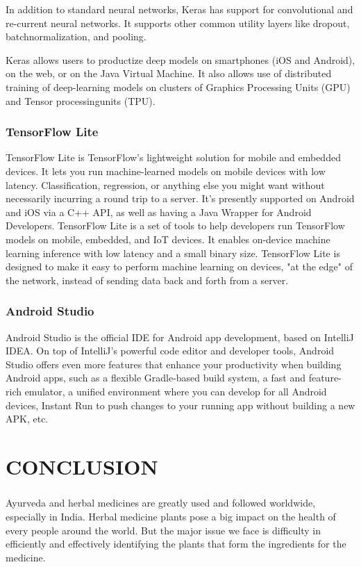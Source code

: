 In addition to standard neural networks, Keras has support for convolutional and re-current  neural  networks.   It  supports  other  common  utility  layers  like  dropout,  batchnormalization, and pooling.

Keras allows users to productize deep models on smartphones (iOS and Android), on the web, or on the Java Virtual Machine. It also allows use of distributed training of deep-learning models on clusters of Graphics Processing Units (GPU) and Tensor processingunits (TPU).

\subsection{TensorFlow Lite}
TensorFlow Lite is TensorFlow’s lightweight solution for mobile and embedded devices. It lets you run machine-learned models on mobile devices with low latency. Classification, regression, or anything else you might want without necessarily incurring a round trip to a server. It’s presently supported on Android and iOS via a C++ API, as well as having a Java Wrapper for Android Developers. TensorFlow Lite is a set of tools to help developers run TensorFlow models on mobile, embedded, and IoT devices. It enables on-device machine learning inference with low latency and a small binary size. TensorFlow Lite is designed to make it easy to perform machine learning on devices, "at the edge" of the network, instead of sending data back and forth from a server.

\subsection{Android Studio}
Android Studio is the official IDE for Android app development, based on IntelliJ IDEA. On top of IntelliJ’s powerful code editor and developer tools, Android Studio offers even more features that enhance your productivity when building Android apps, such as a flexible Gradle-based build system, a fast and feature-rich emulator, a unified environment where you can develop for all Android devices, Instant Run to push changes to your running app without building a new APK, etc.


\chapter{CONCLUSION}
\paragraph{}
Ayurveda and herbal medicines are greatly used and followed worldwide, especially in India. Herbal medicine plants pose a big impact on the health of every people around the world. But the major issue we face is difficulty in efficiently and effectively identifying the plants that form the ingredients for the medicine.

